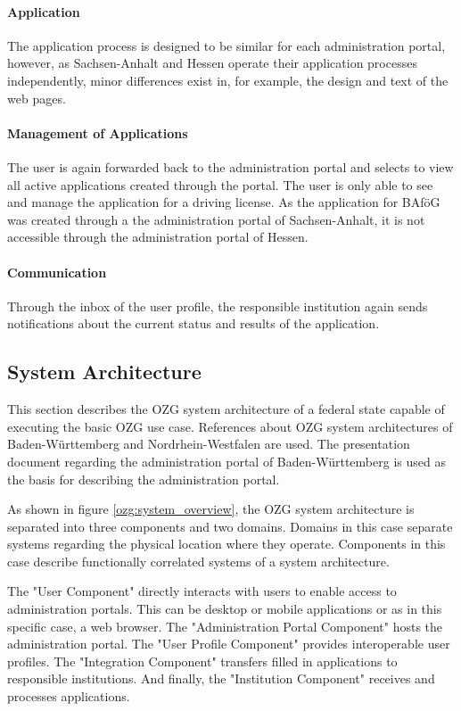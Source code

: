 \paragraph{Application} The application process is designed to be similar for each administration portal, however, as Sachsen-Anhalt and Hessen operate their application processes independently, minor differences exist in, for example, the design and text of the web pages.

\paragraph{Management of Applications} The user is again forwarded back to the administration portal and selects to view all active applications created through the portal. The user is only able to see and manage the application for a driving license. As the application for BAföG was created through a the administration portal of Sachsen-Anhalt, it is not accessible through the administration portal of Hessen.

\paragraph{Communication} Through the inbox of the user profile, the responsible institution again sends notifications about the current status and results of the application.

\subsection{System Architecture}
This section describes the OZG system architecture of a federal state capable of executing the basic OZG use case. References about OZG system architectures of Baden-Württemberg \cite{ozg:bw} and Nordrhein-Westfalen \cite{ozg:nrw} are used. The presentation document regarding the administration portal of Baden-Württemberg \cite{ozg:bw_administration_portal} is used as the basis for describing the administration portal.

As shown in figure \ref{ozg:system_overview}, the OZG system architecture is separated into three components and two domains. Domains in this case separate systems regarding the physical location where they operate. Components in this case describe functionally correlated systems of a system architecture.

The "User Component" directly interacts with users to enable access to administration portals. This can be desktop or mobile applications or as in this specific case, a web browser. The "Administration Portal Component" hosts the administration portal. The "User Profile Component" provides interoperable user profiles. The "Integration Component" transfers filled in applications to responsible institutions. And finally, the "Institution Component" receives and processes applications.

